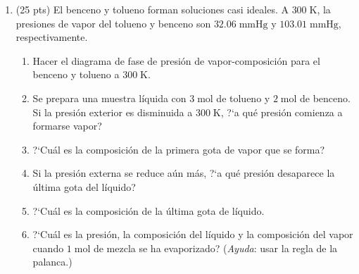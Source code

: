 \documentclass[a4paper,12pt]{article}
\begin{document}
\begin{enumerate}
 \item (25 pts) El benceno y tolueno forman soluciones casi ideales. A $300\;\mbox{K}$, la presiones de vapor del tolueno y benceno son $32.06\;\mbox{mmHg}$ y $103.01\;\mbox{mmHg}$, respectivamente.
\begin{enumerate}
 \item Hacer el diagrama de fase de presi\'on de vapor-composici\'on para el benceno y tolueno a $300\;\mbox{K}$.
 \item Se prepara una muestra l\'iquida con $3\;\mbox{mol}$ de tolueno y $2\;\mbox{mol}$ de benceno. Si la presi\'on exterior es disminuida a $300\;\mbox{K}$, ?`a qu\'e presi\'on comienza a formarse vapor?
 \item ?`Cu\'al es la composici\'on de la primera gota de vapor que se forma?
 \item Si la presi\'on externa se reduce a\'un m\'as, ?`a qu\'e presi\'on desaparece la \'ultima gota del l\'iquido?
 \item ?`Cu\'al es la composici\'on de la \'ultima gota de l\'iquido.
 \item ?`Cu\'al es la presi\'on, la composici\'on del l\'iquido y la composici\'on del vapor cuando $1\;\mbox{mol}$ de mezcla se ha evaporizado? (\emph{Ayuda}: usar la regla de la palanca.)
\end{enumerate} %

\end{enumerate}
\end{document}
